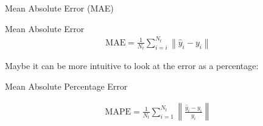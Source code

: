 	\begin{parag}{Mean Absolute Error (MAE)}
		\begin{definition}{Mean Absolute Error}
	    \begin{align*} 
			\text{MAE} =  \frac{1}{N_t}\sum_{i = i}^{N_t}\left\|\hat{y}_i - y_i\right\|
		\end{align*}
	    \end{definition}
		Maybe it can be more intuitive to look at the error as a percentage:
		\begin{definition}{Mean Absolute Percentage Error}
		
		\begin{align*} 
			\text{MAPE} = \frac{1}{N_t}\sum_{i= 1}^{N_t}\left\|\frac{\hat{y}_i - y_i}{y_i}\right\|
		\end{align*}
		\end{definition}
	\end{parag}
	
	
	
	
